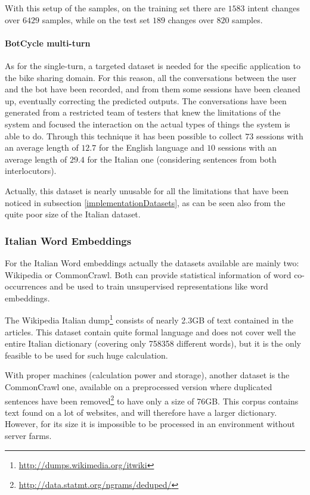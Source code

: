 With this setup of the samples, on the training set there are  \( 1583 \)  intent changes over  \( 6429 \)  samples, while on the test set  \( 189 \)  changes over  \( 820 \)  samples.

\paragraph{BotCycle multi-turn}
As for the single-turn, a targeted dataset is needed for the specific application to the bike sharing domain. For this reason, all the conversations between the user and the bot have been recorded, and from them some sessions have been cleaned up, eventually correcting the predicted outputs. The conversations have been generated from a restricted team of testers that knew the limitations of the system and focused the interaction on the actual types of things the system is able to do. Through this technique it has been possible to collect  \( 73 \)  sessions with an average length of  \( 12.7 \)  for the English language and  \( 10 \)  sessions with an average length of  \( 29.4 \)  for the Italian one (considering sentences from both interlocutors).

Actually, this dataset is nearly unusable for all the limitations that have been noticed in subsection \ref{implementationDatasets}, as can be seen also from the quite poor size of the Italian dataset.

\subsubsection{Italian Word Embeddings}
For the Italian Word embeddings actually the datasets available are mainly two: Wikipedia or CommonCrawl. Both can provide statistical information of word co-occurrences and be used to train unsupervised representations like word embeddings.

The Wikipedia Italian dump\footnote{\url{http://dumps.wikimedia.org/itwiki}} consists of nearly 2.3GB of text contained in the articles. This dataset contain quite formal language and does not cover well the entire Italian dictionary (covering only 758358 different words), but it is the only feasible to be used for such huge calculation.

With proper machines (calculation power and storage), another dataset is the CommonCrawl one, available on a preprocessed version where duplicated sentences have been removed\footnote{\url{http://data.statmt.org/ngrams/deduped/}} to have only a size of 76GB. This corpus contains text found on a lot of websites, and will therefore have a larger dictionary. However, for its size it is impossible to be processed in an environment without server farms.

